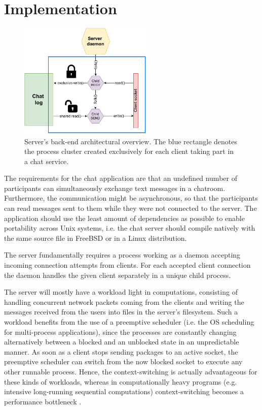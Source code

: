 \section{Implementation}
\begin{figure}[!t]
	\centering
	\includegraphics[width=2.5in]{img/server.pdf}
	\caption{Server's back-end architectural overview. The blue rectangle denotes the process cluster created exclusively for each client taking part in a chat service.}
	\label{fig_server_backend}
\end{figure}
The requirements for the chat application are that an undefined number of participants can simultaneously exchange text messages in a chatroom. Furthermore, the communication might be asynchronous, so that the participants can read messages sent to them while they were not connected to the server. The application should use the least amount of dependencies as possible to enable portability across Unix systems, i.e. the chat server should compile natively with the same source file in FreeBSD or in a Linux distribution.

The server fundamentally requires a process working as a daemon accepting incoming connection attempts from clients. For each accepted client connection the daemon handles the given client separately in a unique child process.

The server will mostly have a workload light in computations, consisting of handling concurrent network packets coming from the clients and writing the messages received from the users into files in the server's filesystem. Such a workload benefits from the use of a preemptive scheduler (i.e. the OS scheduling for multi-process applications), since the processes are constantly changing alternatively between a blocked and an unblocked state in an unpredictable manner. As soon as a client stops sending packages to an active socket, the preemptive scheduler can switch from the now blocked socket to execute any other runnable process. Hence, the context-switching is actually advantageous for these kinds of workloads, whereas in computationally heavy programs (e.g. intensive long-running sequential computations) context-switching becomes a performance bottleneck \cite{Kennedy2018}.

